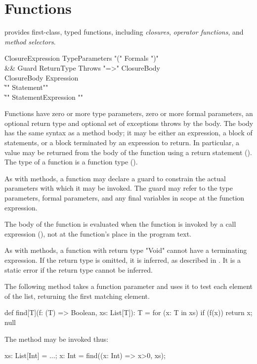 \section{Functions}
\label{Closures}

\Xten{} provides first-class, typed functions, including
\emph{closures},
\emph{operator functions},
and \emph{method selectors}.

\begin{grammar}
ClosureExpression \:
        TypeParameters\opt
        \xcd"("
        Formals\opt
        \xcd")"
\\ &&
        Guard\opt
        ReturnType\opt
        Throws\opt
        \xcd"=>" ClosureBody \\
ClosureBody \:
        Expression \\
        \| \xcd"{" Statement\star \xcd"}" \\
        \| \xcd"{" Statement\star Expression \xcd"}" \\
\end{grammar}

Functions have zero or more type parameters, zero or more
formal parameters, an optional return type and optional set of
exceptions throws by the body.  The body has the same
syntax as a method body; it may be either an expression, a block of
statements, or a block terminated by an expression to return. In
particular, a value may be returned from the body of the function using
a return statement (). The type of a function is a
function type ().

\label{ClosureGuard}

As with methods, a function may declare a guard to
constrain the actual parameters with which it may be invoked.
The guard may refer to the type parameters, formal parameters,
and any final variables in scope at the function expression.

The body of the function is evaluated when the function is
invoked by a call expression (), not at the function's
place in the program text.

As with methods, a function with return type \xcd"Void" cannot
have a terminating expression. 
If the return type is omitted, it is inferred, as described in
.
It is a static error if the return type cannot be inferred. 


\begin{example}
The following method takes a function parameter and uses it to
test each element of the list, returning the first matching
element.
\begin{xten}
def find[T](f: (T) => Boolean, xs: List[T]): T = {
  for (x: T in xs)
    if (f(x)) return x;
  null
}
\end{xten}

The method may be invoked thus:
\begin{xten}
xs: List[Int] = ...;
x: Int = find((x: Int) => x>0, xs);
\end{xten}
\end{example}

